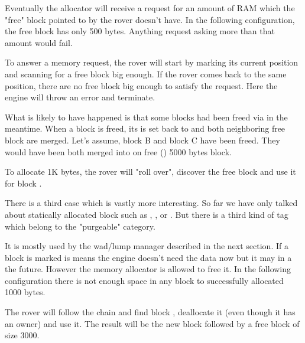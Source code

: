 Eventually the allocator will receive a request for an amount of RAM which the "free" block pointed to by the rover doesn't have. In the following configuration, the free block has only 500 bytes. Anything request asking more than that amount would fail.\\
\par
{}
\par
To answer a memory request, the rover will start by marking its current position and scanning for a free block big enough. If the rover comes back to the same position, there are no free block big enough to satisfy the request. Here the engine will throw an error and terminate.\\
\par
What is likely to have happened is that some blocks had been freed via  in the meantime. When a block is freed, its  is set back to  and both neighboring free block are merged. Let's assume, block B and block C have been freed. They would have been both merged into on free () 5000 bytes block.\\
\par
{}
\par
To allocate 1K bytes, the rover will "roll over", discover the free block and use it for block .\\
\par
{}
\par
There is a third case which is vastly more interesting. So far we have only talked about statically allocated block such as , , or . But there is a third kind of tag which belong to the "purgeable" category.\\
\par
 It is mostly used by the wad/lump manager described in the next section. If a block is marked  is means the engine doesn't need the data now but it may in a the future. However the memory allocator is allowed to free it. In the following configuration there is not enough space in any block to successfully allocated 1000 bytes.\\
\par
{}
\par
The rover will follow the chain and find block , deallocate it (even though it has an owner) and use it. The result will be the new block  followed by a free block of size 3000.\\
\par
{}
\par

